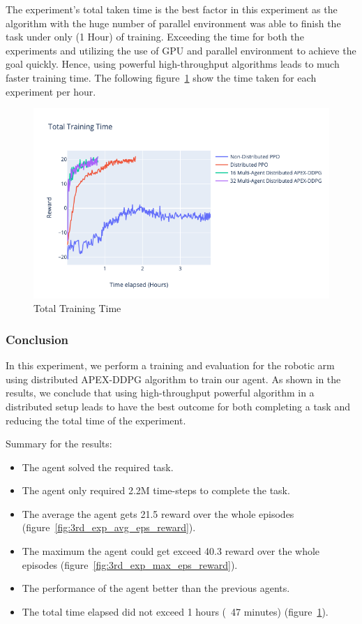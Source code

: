 The experiment's total taken time is the best factor in this experiment as the algorithm with the huge number of parallel environment was able to finish the task under only (1 Hour) of training. Exceeding the time for both the experiments and utilizing the use of GPU and parallel environment to achieve the goal quickly. Hence, using powerful high-throughput algorithms leads to much faster training time. The following figure~\ref{fig:3rd_exp_total_training_time} show the time taken for each experiment per hour.
\begin{figure}[!htb]
	\centering
	\includegraphics[width=\linewidth]{figures/exps/3rd_exp/total_training_time.png}
	\caption{Total Training Time}
	\label{fig:3rd_exp_total_training_time}
\end{figure}


\subsubsection{Conclusion}

In this experiment, we perform a training and evaluation for the robotic arm using distributed APEX-DDPG algorithm to train our agent. As shown in the results, we conclude that using high-throughput powerful algorithm in a distributed setup leads to have the best outcome for both completing a task and reducing the total time of the experiment.

Summary for the results:
\begin{itemize}
	\item The agent solved the required task.
	\item The agent only required 2.2M time-steps to complete the task.
	\item The average the agent gets 21.5 reward over the whole episodes (figure~\ref{fig:3rd_exp_avg_eps_reward}).
	\item The maximum the agent could get exceed 40.3 reward over the whole episodes (figure~\ref{fig:3rd_exp_max_eps_reward}).
	\item The performance of the agent better than the previous agents.
	\item The total time elapsed did not exceed 1 hours (~47 minutes) (figure~\ref{fig:3rd_exp_total_training_time}).
\end{itemize}